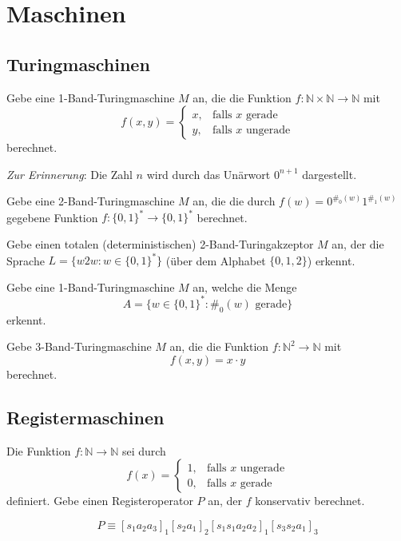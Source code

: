 \documentclass[german,headsepline]{scrartcl}
\theoremstyle{definition}
\begin{document}
	\section{Maschinen}
	
	\subsection{Turingmaschinen}
	\begin{question}[subtitle={Klausur 2012}]
		Gebe eine 1-Band-Turingmaschine $M$ an,
		die die Funktion $f:\mathbb{N}\times\mathbb{N}\to\mathbb{N}$ mit
		\[f(x,y)=\begin{cases}
			x, &\text{falls $x$ gerade} \\
			y, &\text{falls $x$ ungerade}
		\end{cases}\]
		berechnet.
		
		\textit{Zur Erinnerung}: Die Zahl $n$ wird durch das Unärwort $0^{n+1}$ dargestellt.
	\end{question}
	
	\begin{question}[subtitle={Klausur 2014}]
		Gebe eine 2-Band-Turingmaschine $M$ an, die die durch $f(w)=0^{\#_0(w)}1^{\#_1(w)}$ gegebene Funktion $f:\{0,1\}^*\to\{0,1\}^*$ berechnet.
	\end{question}
	
	\begin{question}[subtitle={Klausur 2015}]
		Gebe einen totalen (deterministischen) 2-Band-Turingakzeptor $M$ an,
		der die Sprache $L=\{w2w\colon w\in\{0,1\}^*\}$ (über dem Alphabet $\{0,1,2\}$) erkennt.
	\end{question}
	
	\begin{question}[subtitle={Blatt 13, 2015}]
		Gebe eine 1-Band-Turingmaschine $M$ an, welche die Menge
		\[A=\{w\in\{0,1\}^*\colon\#_0(w)\text{ gerade}\}\]
		erkennt.
	\end{question}
	
	\begin{question}
		Gebe 3-Band-Turingmaschine $M$ an, die die Funktion $f:\mathbb{N}^2\to\mathbb{N}$ mit
		\[f(x,y)=x\cdot y\]
		berechnet.
	\end{question}
	
	\subsection{Registermaschinen}
	\begin{question}[subtitle={Klausur 2015}]
		Die Funktion $f:\mathbb{N}\to\mathbb{N}$ sei durch
		\[f(x)=\begin{cases}
			1, &\text{falls $x$ ungerade} \\
			0, &\text{falls $x$ gerade}
		\end{cases}\]
		definiert.
		Gebe einen Registeroperator $P$ an, der $f$ konservativ berechnet.
	\end{question}
	\begin{solution}
		\[P\equiv[s_1a_2a_3]_1[s_2a_1]_2[s_1s_1a_2a_2]_1[s_3s_2a_1]_3\]
	\end{solution}
	
\end{document}
